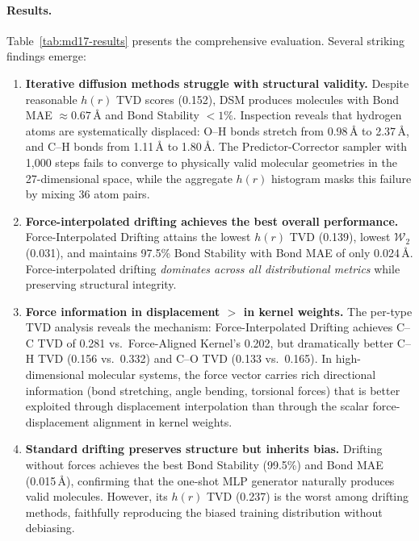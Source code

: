 \documentclass[11pt]{article}
\begin{document}
\paragraph{Results.}
Table~\ref{tab:md17-results} presents the comprehensive evaluation.
Several striking findings emerge:

\begin{enumerate}
    \item \textbf{Iterative diffusion methods struggle with structural validity.}
    Despite reasonable $h(r)$ TVD scores (0.152), DSM produces molecules with Bond MAE $\approx 0.67$\,\AA{} and Bond Stability $< 1\%$.
    Inspection reveals that hydrogen atoms are systematically displaced: O--H bonds stretch from 0.98\,\AA{} to 2.37\,\AA{}, and C--H bonds from 1.11\,\AA{} to 1.80\,\AA.
    The Predictor-Corrector sampler with 1{,}000 steps fails to converge to physically valid molecular geometries in the 27-dimensional space, while the aggregate $h(r)$ histogram masks this failure by mixing 36 atom pairs.

    \item \textbf{Force-interpolated drifting achieves the best overall performance.}
    Force-Interpolated Drifting attains the lowest $h(r)$ TVD (0.139), lowest $\mathcal{W}_2$ (0.031), and maintains 97.5\% Bond Stability with Bond MAE of only 0.024\,\AA.
Force-interpolated drifting \emph{dominates across all distributional metrics} while preserving structural integrity.

    \item \textbf{Force information in displacement $>$ in kernel weights.}
    The per-type TVD analysis reveals the mechanism: Force-Interpolated Drifting achieves C--C TVD of 0.281 vs.\ Force-Aligned Kernel's 0.202, but dramatically better C--H TVD (0.156 vs.\ 0.332) and C--O TVD (0.133 vs.\ 0.165).
    In high-dimensional molecular systems, the force vector carries rich directional information (bond stretching, angle bending, torsional forces) that is better exploited through displacement interpolation than through the scalar force-displacement alignment in kernel weights.

    \item \textbf{Standard drifting preserves structure but inherits bias.}
    Drifting without forces achieves the best Bond Stability (99.5\%) and Bond MAE (0.015\,\AA), confirming that the one-shot MLP generator naturally produces valid molecules.
    However, its $h(r)$ TVD (0.237) is the worst among drifting methods, faithfully reproducing the biased training distribution without debiasing.


\end{enumerate}
\end{document}
